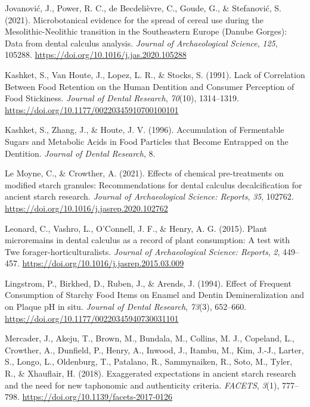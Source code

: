 \documentclass[
  letterpaper,
]{book}
\newlength{\cslhangindent}
\newlength{\cslentryspacingunit} %
\newenvironment{CSLReferences}[2] %
 {%
  \setlength{\parindent}{0pt}
  \ifodd #1
  \let\oldpar\par
  \def\par{\hangindent=\cslhangindent\oldpar}
  \fi
  \setlength{\parskip}{#2\cslentryspacingunit}
 }%
 {}
\begin{document}
\begin{CSLReferences}{1}{0}
\leavevmode{}%
Jovanović, J., Power, R. C., de Becdelièvre, C., Goude, G., \&
Stefanović, S. (2021). Microbotanical evidence for the spread of cereal
use during the {Mesolithic-Neolithic} transition in the {Southeastern
Europe} ({Danube Gorges}): {Data} from dental calculus analysis.
\emph{Journal of Archaeological Science}, \emph{125}, 105288.
\url{https://doi.org/10.1016/j.jas.2020.105288}

\leavevmode{}%
Kashket, S., Van Houte, J., Lopez, L. R., \& Stocks, S. (1991). Lack of
{Correlation Between Food Retention} on the {Human Dentition} and
{Consumer Perception} of {Food Stickiness}. \emph{Journal of Dental
Research}, \emph{70}(10), 1314--1319.
\url{https://doi.org/10.1177/00220345910700100101}

\leavevmode{}%
Kashket, S., Zhang, J., \& Houte, J. V. (1996). Accumulation of
{Fermentable Sugars} and {Metabolic Acids} in {Food Particles} that
{Become Entrapped} on the {Dentition}. \emph{Journal of Dental
Research}, 8.

\leavevmode{}%
Le Moyne, C., \& Crowther, A. (2021). Effects of chemical pre-treatments
on modified starch granules: {Recommendations} for dental calculus
decalcification for ancient starch research. \emph{Journal of
Archaeological Science: Reports}, \emph{35}, 102762.
\url{https://doi.org/10.1016/j.jasrep.2020.102762}

\leavevmode{}%
Leonard, C., Vashro, L., O'Connell, J. F., \& Henry, A. G. (2015). Plant
microremains in dental calculus as a record of plant consumption: {A}
test with {Twe} forager-horticulturalists. \emph{Journal of
Archaeological Science: Reports}, \emph{2}, 449--457.
\url{https://doi.org/10.1016/j.jasrep.2015.03.009}

\leavevmode{}%
Lingstrom, P., Birkhed, D., Ruben, J., \& Arends, J. (1994). Effect of
{Frequent Consumption} of {Starchy Food Items} on {Enamel} and {Dentin
Demineralization} and on {Plaque pH} in situ. \emph{Journal of Dental
Research}, \emph{73}(3), 652--660.
\url{https://doi.org/10.1177/00220345940730031101}

\leavevmode{}%
Mercader, J., Akeju, T., Brown, M., Bundala, M., Collins, M. J.,
Copeland, L., Crowther, A., Dunfield, P., Henry, A., Inwood, J., Itambu,
M., Kim, J.-J., Larter, S., Longo, L., Oldenburg, T., Patalano, R.,
Sammynaiken, R., Soto, M., Tyler, R., \& Xhauflair, H. (2018).
Exaggerated expectations in ancient starch research and the need for new
taphonomic and authenticity criteria. \emph{FACETS}, \emph{3}(1),
777--798. \url{https://doi.org/10.1139/facets-2017-0126}


\end{CSLReferences}
\end{document}
